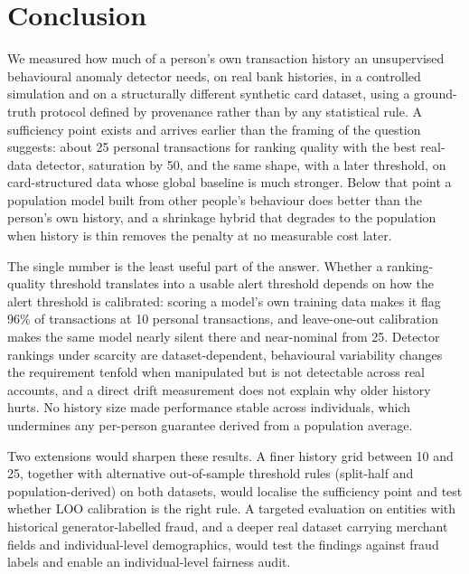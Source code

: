 \section{Conclusion}\label{sec:conclusion}

We measured how much of a person's own transaction history an unsupervised behavioural anomaly detector needs, on real bank histories, in a controlled simulation and on a structurally different synthetic card dataset, using a ground-truth protocol defined by provenance rather than by any statistical rule. A sufficiency point exists and arrives earlier than the framing of the question suggests: about 25 personal transactions for ranking quality with the best real-data detector, saturation by 50, and the same shape, with a later threshold, on card-structured data whose global baseline is much stronger. Below that point a population model built from other people's behaviour does better than the person's own history, and a shrinkage hybrid that degrades to the population when history is thin removes the penalty at no measurable cost later.

The single number is the least useful part of the answer. Whether a ranking-quality threshold translates into a usable alert threshold depends on how the alert threshold is calibrated: scoring a model's own training data makes it flag 96\% of transactions at 10 personal transactions, and leave-one-out calibration makes the same model nearly silent there and near-nominal from 25. Detector rankings under scarcity are dataset-dependent, behavioural variability changes the requirement tenfold when manipulated but is not detectable across real accounts, and a direct drift measurement does not explain why older history hurts. No history size made performance stable across individuals, which undermines any per-person guarantee derived from a population average.

Two extensions would sharpen these results. A finer history grid between 10 and 25, together with alternative out-of-sample threshold rules (split-half and population-derived) on both datasets, would localise the sufficiency point and test whether LOO calibration is the right rule. A targeted evaluation on entities with historical generator-labelled fraud, and a deeper real dataset carrying merchant fields and individual-level demographics, would test the findings against fraud labels and enable an individual-level fairness audit.
